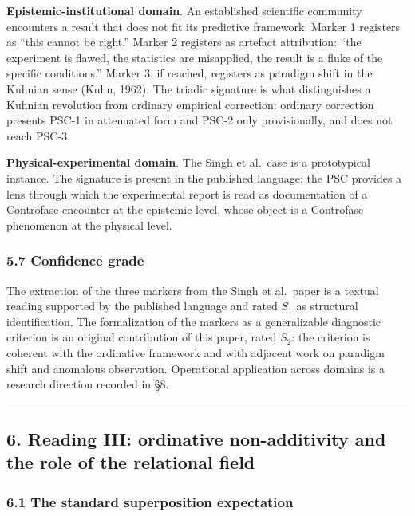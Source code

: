 \documentclass[
  11pt,
  a4paper,
]{article}
\begin{document}
\textbf{Epistemic-institutional domain}. An established scientific
community encounters a result that does not fit its predictive
framework. Marker 1 registers as ``this cannot be right.'' Marker 2
registers as artefact attribution: ``the experiment is flawed, the
statistics are misapplied, the result is a fluke of the specific
conditions.'' Marker 3, if reached, registers as paradigm shift in the
Kuhnian sense (Kuhn, 1962). The triadic signature is what distinguishes
a Kuhnian revolution from ordinary empirical correction: ordinary
correction presents PSC-1 in attenuated form and PSC-2 only
provisionally, and does not reach PSC-3.

\textbf{Physical-experimental domain}. The Singh et al.~case is a
prototypical instance. The signature is present in the published
language; the PSC provides a lens through which the experimental report
is read as documentation of a Controfase encounter at the epistemic
level, whose object is a Controfase phenomenon at the physical level.

\subsubsection{5.7 Confidence grade}\label{confidence-grade-1}

The extraction of the three markers from the Singh et al.~paper is a
textual reading supported by the published language and rated \(S_1\) as
structural identification. The formalization of the markers as a
generalizable diagnostic criterion is an original contribution of this
paper, rated \(S_2\): the criterion is coherent with the ordinative
framework and with adjacent work on paradigm shift and anomalous
observation. Operational application across domains is a research
direction recorded in §8.

\begin{center}\rule{0.5\linewidth}{0.5pt}\end{center}

\subsection{6. Reading III: ordinative non-additivity and the role of
the relational
field}\label{reading-iii-ordinative-non-additivity-and-the-role-of-the-relational-field}

\subsubsection{6.1 The standard superposition
expectation}\label{the-standard-superposition-expectation}
\end{document}
